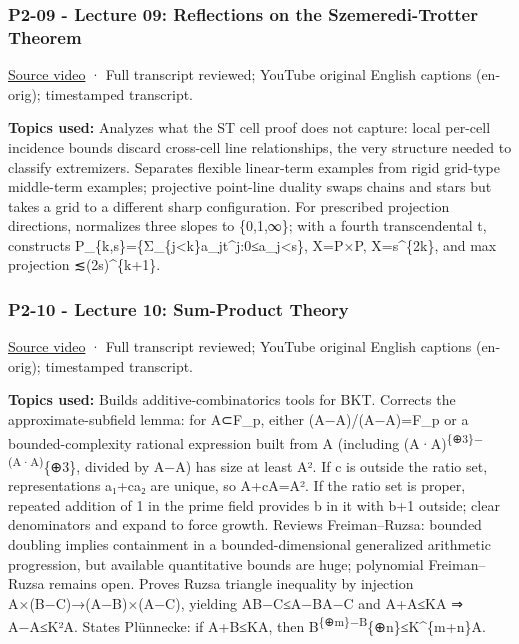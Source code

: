 \subsubsection{P2-09 - Lecture 09: Reflections on the Szemeredi-Trotter Theorem}\label{04-visual-computing-ii-ch036-p2-09---lecture-09-reflections-on-the-szemeredi-trotter-theorem}

\href{https://www.youtube.com/watch?v=lvdIUKULiak}{Source video} · Full transcript reviewed; YouTube original English captions (en-orig); timestamped transcript.

\textbf{Topics used:} Analyzes what the ST cell proof does not capture: local per-cell incidence bounds discard cross-cell line relationships, the very structure needed to classify extremizers. Separates flexible linear-term examples from rigid grid-type middle-term examples; projective point-line duality swaps chains and stars but takes a grid to a different sharp configuration. For prescribed projection directions, normalizes three slopes to \{0,1,∞\}; with a fourth transcendental t, constructs P\_\{k,s\}=\{Σ\_\{j\textless k\}a\_jt\^{}j:0≤a\_j\textless s\}, X=P×P, \textbar X\textbar=s\^{}\{2k\}, and max projection ≲(2s)\^{}\{k+1\}.

\subsubsection{P2-10 - Lecture 10: Sum-Product Theory}\label{04-visual-computing-ii-ch036-p2-10---lecture-10-sum-product-theory}

\href{https://www.youtube.com/watch?v=VCOrx2jEKXk}{Source video} · Full transcript reviewed; YouTube original English captions (en-orig); timestamped transcript.

\textbf{Topics used:} Builds additive-combinatorics tools for BKT. Corrects the approximate-subfield lemma: for A⊂F\_p, either (A−A)/(A−A)=F\_p or a bounded-complexity rational expression built from A (including (A·A)\textsuperscript{\{⊕3\}−(A·A)}\{⊕3\}, divided by A−A) has size at least \textbar A\textbar². If c is outside the ratio set, representations a₁+ca₂ are unique, so \textbar A+cA\textbar=\textbar A\textbar². If the ratio set is proper, repeated addition of 1 in the prime field provides b in it with b+1 outside; clear denominators and expand to force growth. Reviews Freiman--Ruzsa: bounded doubling implies containment in a bounded-dimensional generalized arithmetic progression, but available quantitative bounds are huge; polynomial Freiman--Ruzsa remains open. Proves Ruzsa triangle inequality by injection A×(B−C)→(A−B)×(A−C), yielding \textbar A\textbar\textbar B−C\textbar≤\textbar A−B\textbar\textbar A−C\textbar{} and \textbar A+A\textbar≤K\textbar A\textbar{} ⇒ \textbar A−A\textbar≤K²\textbar A\textbar. States Plünnecke: if \textbar A+B\textbar≤K\textbar A\textbar, then \textbar B\textsuperscript{\{⊕m\}−B}\{⊕n\}\textbar≤K\^{}\{m+n\}\textbar A\textbar.

